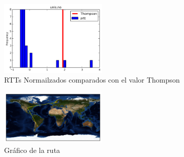 \begin{figure}[H]
  \centering
    \includegraphics[width=0.45\textwidth]{histogramas_thompson/unis-no.png}
  \caption{RTTs Normailzados comparados con el valor Thompson}
  \label{entropia-s}
\end{figure}

\begin{figure}[H]
  \centering
    \includegraphics[width=0.45\textwidth]{grafico-rutas/unis-no.png}
  \caption{Gráfico de la ruta}
  \label{entropia-s}
\end{figure}




